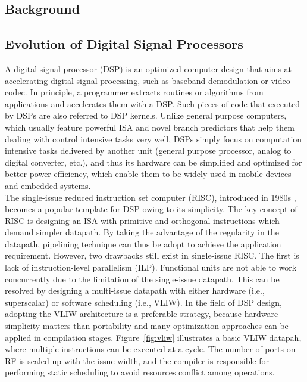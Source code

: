 \documentclass[12pt]{article}
\begin{document}
\begin{CJK}{UTF8}{bkai}
\newpage

\section{Background}

    \subsection{Evolution of Digital Signal Processors}
        A digital signal processor (DSP) is an optimized computer design that aims at accelerating digital signal processing, such as baseband demodulation or video codec.
        In principle, a programmer extracts routines or algorithms from applications and accelerates them with a DSP.
        Such pieces of code that executed by DSPs are also referred to DSP kernels.
        Unlike general purpose computers, which usually feature powerful ISA and novel branch predictors that help them dealing with control intensive tasks very well,
        DSPs simply focus on computation intensive tasks delivered by another unit (general purpose processor, analog to digital converter, etc.), 
        and thus its hardware can be simplified and optimized for better power efficiency, which enable them to be widely used in mobile devices and embedded systems.
        \\\indent
        The single-issue reduced instruction set computer (RISC), introduced in 1980s \cite{risc}, becomes a popular template for DSP owing to its simplicity.
        The key concept of RISC is designing an ISA with primitive and orthogonal instructions which demand simpler datapath.
        By taking the advantage of the regularity in the datapath, pipelining technique can thus be adopt to achieve the application requirement.
        However, two drawbacks still exist in single-issue RISC. 
        The first is lack of instruction-level parallelism (ILP). 
        Functional units are not able to work concurrently due to the limitation of the single-issue datapath.
        This can be resolved by designing a multi-issue datapath with either hardware (i.e., superscalar) or software scheduling (i.e., VLIW).
        In the field of DSP design, adopting the VLIW architecture is a preferable strategy, 
        because hardware simplicity matters than portability and many optimization approaches can be applied in compilation stages. 
        Figure~\ref{fig:vliw} illustrates a basic VLIW datapah, where multiple instructions can be executed at a cycle.
        The number of ports on RF is scaled up with the issue-width, and the compiler is responsible for performing static scheduling to avoid resources conflict among operations.

\end{CJK}
\end{document}
